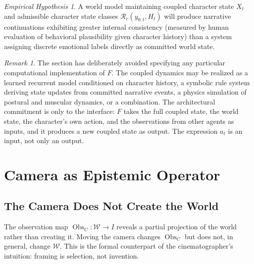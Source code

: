 \documentclass[11pt,a4paper]{article}
\theoremstyle{plain}
\theoremstyle{definition}
\theoremstyle{remark}
\newtheorem{remark}[theorem]{Remark}
\newtheorem{hypothesis}[theorem]{Empirical Hypothesis}
\DeclareMathOperator{\Obs}{Obs}
\begin{document}
\begin{hypothesis}
\label{hyp:affect-integration}
A world model maintaining coupled character state $X_t$ and admissible character state classes $\mathcal{R}_c(y_{0:t}, H_t)$ will produce narrative continuations exhibiting greater internal consistency (measured by human evaluation of behavioral plausibility given character history) than a system assigning discrete emotional labels directly as committed world state.
\end{hypothesis}

\begin{remark}
The section has deliberately avoided specifying any particular computational implementation of $F$. The coupled dynamics may be realized as a learned recurrent model conditioned on character history, a symbolic rule system deriving state updates from committed narrative events, a physics simulation of postural and muscular dynamics, or a combination. The architectural commitment is only to the interface: $F$ takes the full coupled state, the world state, the character's own action, and the observations from other agents as inputs, and it produces a new coupled state as output. The expression $a_t$ is an input, not only an output.
\end{remark}


\section{Camera as Epistemic Operator}
\label{sec:camera}

\subsection{The Camera Does Not Create the World}

The observation map $\Obs_C : \mathcal{W} \to I$ reveals a partial projection of the world rather than creating it. Moving the camera changes $\Obs_C$ but does not, in general, change $\mathcal{W}$. This is the formal counterpart of the cinematographer's intuition: framing is selection, not invention.
\end{document}

